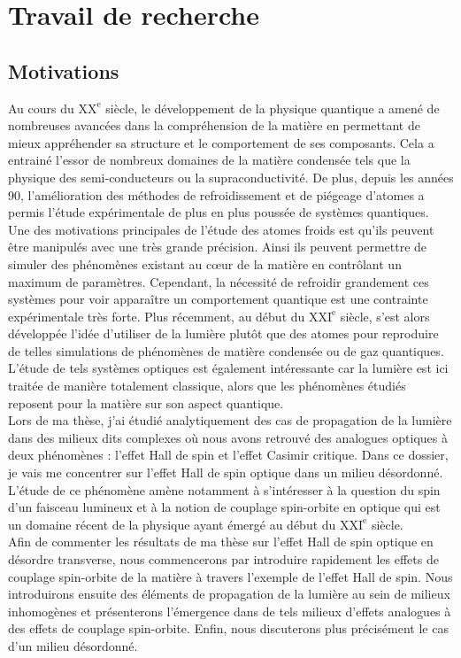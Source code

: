 \documentclass[a4paper,11pt]{article} %
\begin{document}
	
	\section{Travail de recherche}
	\subsection{Motivations}
	Au cours du $ \text{XX}^\text{e} $ siècle, le développement de la physique quantique a amené de nombreuses avancées dans la compréhension de la matière en permettant de mieux appréhender sa structure et le comportement de ses composants. Cela a entrainé l'essor de nombreux domaines de la matière condensée tels que la physique des semi-conducteurs ou la supraconductivité. De plus, depuis les années 90, l'amélioration des méthodes de refroidissement et de piégeage d'atomes a permis l'étude expérimentale de plus en plus poussée de systèmes quantiques. Une des motivations principales de l'étude des atomes froids est qu'ils peuvent être manipulés avec une très grande précision. Ainsi ils peuvent permettre de simuler des phénomènes existant au c\oe ur de la matière en contrôlant un maximum de paramètres. Cependant, la nécessité de refroidir grandement ces systèmes pour voir apparaître un comportement quantique est une contrainte expérimentale très forte. Plus récemment, au début du $ \text{XXI}^\text{e} $ siècle, s'est alors développée l'idée d'utiliser de la lumière plutôt que des atomes pour reproduire de telles simulations de phénomènes de matière condensée ou de gaz quantiques. L'étude de tels systèmes optiques est également intéressante car la lumière est ici traitée de manière totalement classique, alors que les phénomènes étudiés reposent pour la matière sur son aspect quantique.\\
	
	Lors de ma thèse, j'ai étudié analytiquement des cas de propagation de la lumière dans des milieux dits complexes où nous avons retrouvé des analogues optiques à deux phénomènes : l'effet Hall de spin et l'effet Casimir critique. Dans ce dossier, je vais me concentrer sur l'effet Hall de spin optique dans un milieu désordonné. L'étude de ce phénomène amène notamment à s'intéresser à la question du spin d'un faisceau lumineux et à la notion de couplage spin-orbite en optique qui est un domaine récent de la physique ayant émergé au début du $ \text{XXI}^\text{e} $ siècle.\\
	
	Afin de commenter les résultats de ma thèse sur l'effet Hall de spin optique en désordre transverse, nous commencerons par introduire rapidement les effets de couplage spin-orbite de la matière à travers l'exemple de l'effet Hall de spin. Nous introduirons ensuite des éléments de propagation de la lumière au sein de milieux inhomogènes et présenterons l'émergence dans de tels milieux d'effets analogues à des effets de couplage spin-orbite. Enfin, nous discuterons plus précisément le cas d'un milieu désordonné.
	
\end{document}
